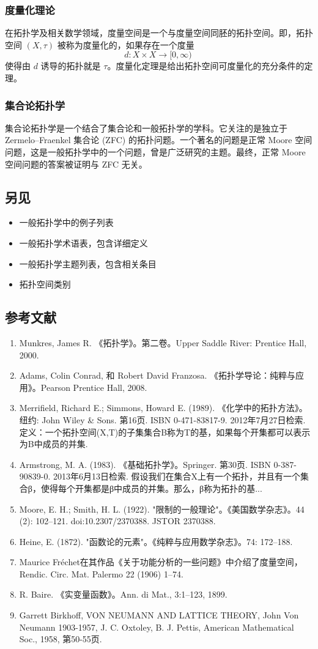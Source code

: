 \subsubsection{度量化理论}
在拓扑学及相关数学领域，度量空间是一个与度量空间同胚的拓扑空间。即，拓扑空间 $(X, \tau)$ 被称为度量化的，如果存在一个度量
$$
d: X \times X \to [0, \infty)~
$$
使得由 $d$ 诱导的拓扑就是 $\tau$。度量化定理是给出拓扑空间可度量化的充分条件的定理。
\subsubsection{集合论拓扑学}
集合论拓扑学是一个结合了集合论和一般拓扑学的学科。它关注的是独立于 Zermelo–Fraenkel 集合论 (ZFC) 的拓扑问题。一个著名的问题是正常 Moore 空间问题，这是一般拓扑学中的一个问题，曾是广泛研究的主题。最终，正常 Moore 空间问题的答案被证明与 ZFC 无关。
\subsection{另见}
\begin{itemize}
\item 一般拓扑学中的例子列表
\item 一般拓扑学术语表，包含详细定义
\item 一般拓扑学主题列表，包含相关条目
\item 拓扑空间类别
\end{itemize}
\subsection{参考文献}
\begin{enumerate}
\item Munkres, James R. 《拓扑学》。第二卷。Upper Saddle River: Prentice Hall, 2000.
\item Adams, Colin Conrad, 和 Robert David Franzosa. 《拓扑学导论：纯粹与应用》。Pearson Prentice Hall, 2008.
\item Merrifield, Richard E.; Simmons, Howard E. (1989). 《化学中的拓扑方法》。纽约: John Wiley & Sons. 第16页. ISBN 0-471-83817-9. 2012年7月27日检索. 定义：一个拓扑空间(X,T)的子集集合B称为T的基，如果每个开集都可以表示为B中成员的并集.
\item Armstrong, M. A. (1983). 《基础拓扑学》。Springer. 第30页. ISBN 0-387-90839-0. 2013年6月13日检索. 假设我们在集合X上有一个拓扑，并且有一个集合β，使得每个开集都是β中成员的并集。那么，β称为拓扑的基...
\item Moore, E. H.; Smith, H. L. (1922). "限制的一般理论"。《美国数学杂志》。44 (2): 102–121. doi:10.2307/2370388. JSTOR 2370388.
\item Heine, E. (1872). "函数论的元素"。《纯粹与应用数学杂志》。74: 172–188.
\item Maurice Fréchet在其作品《关于功能分析的一些问题》中介绍了度量空间，Rendic. Circ. Mat. Palermo 22 (1906) 1–74.
\item R. Baire. 《实变量函数》。Ann. di Mat., 3:1–123, 1899.
\item Garrett Birkhoff, VON NEUMANN AND LATTICE THEORY, John Von Neumann 1903-1957, J. C. Oxtoley, B. J. Pettis, American Mathematical Soc., 1958, 第50-55页.
\end{enumerate}
